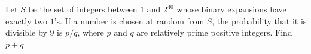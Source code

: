 Let $S$ be the set of integers between $1$ and $2^{40}$ whose binary expansions have exactly two $1$'s. If a number is chosen at random from $S$, the probability that it is divisible by $9$ is $p/q$, where $p$ and $q$ are relatively prime positive integers. Find $p+q$.